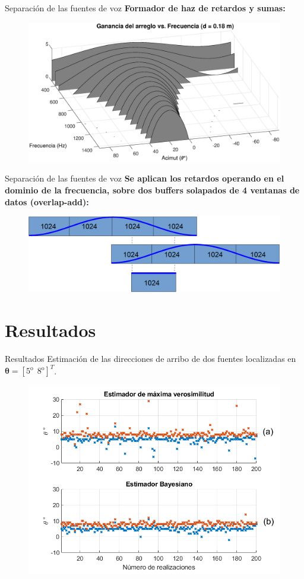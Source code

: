 \documentclass[12pt,aspectratio=169]{beamer}
\begin{document}
	\begin{frame}{Separación de las fuentes de voz}
		\textbf{Formador de haz de retardos y sumas:}\\	
		\vspace{5mm}
		\begin{figure}[h]
			\centering
			\includegraphics[width=0.8\linewidth]{figures/patternvsfreq}
		\end{figure}
	\end{frame}
	
	\begin{frame}{Separación de las fuentes de voz}
		\textbf{Se aplican los retardos operando en el dominio de la frecuencia, sobre dos buffers solapados de 4 ventanas de datos (overlap-add):}\\		
		\vspace{5mm}
		\begin{figure}[h]
			\centering
			\includegraphics[width=0.8\linewidth]{figures/Buffers.eps}
		\end{figure}
	\end{frame}
	
	\section{Resultados}
	
	\begin{frame}{Resultados}
	Estimación de las direcciones de arribo de dos fuentes localizadas en $\pmb{\theta} = [5^{\mathrm{o}}~~8^{\mathrm{o}}]^T$.				
		\begin{figure}[h]
			\centering
			\includegraphics[width=0.58\linewidth]{figures/Fig12.png}
		\end{figure}
	\end{frame}
	
\end{document}
